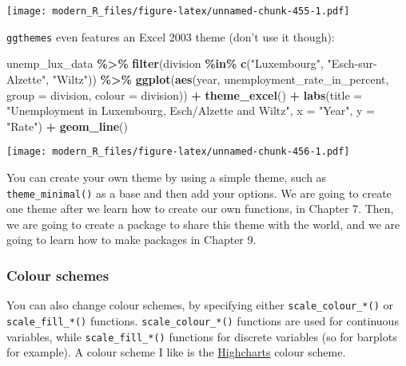 \documentclass[
]{article}
\newenvironment{Shaded}{\begin{snugshade}}{\end{snugshade}}
\newcommand{\DataTypeTok}[1]{\textcolor[rgb]{0.13,0.29,0.53}{#1}}
\newcommand{\KeywordTok}[1]{\textcolor[rgb]{0.13,0.29,0.53}{\textbf{#1}}}
\newcommand{\NormalTok}[1]{#1}
\newcommand{\OperatorTok}[1]{\textcolor[rgb]{0.81,0.36,0.00}{\textbf{#1}}}
\newcommand{\StringTok}[1]{\textcolor[rgb]{0.31,0.60,0.02}{#1}}
\begin{document}
\texttt{[image: modern\_R\_files/figure-latex/unnamed-chunk-455-1.pdf]}

\texttt{ggthemes} even features an Excel 2003 theme (don't use it though):

\begin{Shaded}
\begin{Highlighting}[]
\NormalTok{unemp\_lux\_data }\OperatorTok{\%\textgreater{}\%}
\StringTok{  }\KeywordTok{filter}\NormalTok{(division }\OperatorTok{\%in\%}\StringTok{ }\KeywordTok{c}\NormalTok{(}\StringTok{"Luxembourg"}\NormalTok{, }\StringTok{"Esch{-}sur{-}Alzette"}\NormalTok{, }\StringTok{"Wiltz"}\NormalTok{)) }\OperatorTok{\%\textgreater{}\%}
\StringTok{  }\KeywordTok{ggplot}\NormalTok{(}\KeywordTok{aes}\NormalTok{(year, unemployment\_rate\_in\_percent, }\DataTypeTok{group =}\NormalTok{ division, }\DataTypeTok{colour =}\NormalTok{ division)) }\OperatorTok{+}
\StringTok{  }\KeywordTok{theme\_excel}\NormalTok{() }\OperatorTok{+}
\StringTok{  }\KeywordTok{labs}\NormalTok{(}\DataTypeTok{title =} \StringTok{"Unemployment in Luxembourg, Esch/Alzette and Wiltz"}\NormalTok{, }\DataTypeTok{x =} \StringTok{"Year"}\NormalTok{, }\DataTypeTok{y =} \StringTok{"Rate"}\NormalTok{) }\OperatorTok{+}
\StringTok{  }\KeywordTok{geom\_line}\NormalTok{()}
\end{Highlighting}
\end{Shaded}

\texttt{[image: modern\_R\_files/figure-latex/unnamed-chunk-456-1.pdf]}

You can create your own theme by using a simple theme, such as \texttt{theme\_minimal()} as a base
and then add your options. We are going to create one theme after we learn how to create our
own functions, in Chapter 7. Then, we are going to create a package to share this theme with
the world, and we are going to learn how to make packages in Chapter 9.

\hypertarget{colour-schemes}{%
\subsubsection{Colour schemes}\label{colour-schemes}}

You can also change colour schemes, by specifying either \texttt{scale\_colour\_*()} or \texttt{scale\_fill\_*()}
functions. \texttt{scale\_colour\_*()} functions are used for continuous variables, while \texttt{scale\_fill\_*()}
functions for discrete variables (so for barplots for example). A colour scheme I like is the
\href{https://www.highcharts.com/}{Highcharts} colour scheme.
\end{document}
